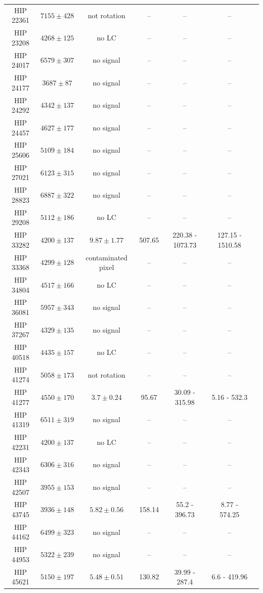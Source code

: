 \begin{longtable}{|c|c|c|c|c|c|c|}
HIP 22361 & $ 7155 \pm 428 $ & not rotation &-- &-- &-- \\
HIP 23208 & $ 4268 \pm 125 $ & no LC &-- &-- &-- \\
HIP 24017 & $ 6579 \pm 307 $ & no signal &-- &-- &-- \\
HIP 24177 & $ 3687 \pm 87 $ & no signal &-- &-- &-- \\
HIP 24292 & $ 4342 \pm 137 $ & no signal &-- &-- &-- \\
HIP 24457 & $ 4627 \pm 177 $ & no signal &-- &-- &-- \\
HIP 25606 & $ 5109 \pm 184 $ & no signal &-- &-- &-- \\
HIP 27021 & $ 6123 \pm 315 $ & no signal &-- &-- &-- \\
HIP 28823 & $ 6887 \pm 322 $ & no signal &-- &-- &-- \\
HIP 29208 & $ 5112 \pm 186 $ & no LC &-- &-- &-- \\
HIP 33282 & $ 4200 \pm 137 $ &$ 9.87 \pm 1.77 $ & 507.65 & 220.38 - 1073.73 & 127.15 - 1510.58 \\
HIP 33368 & $ 4299 \pm 128 $ & contaminated pixel &-- &-- &-- \\
HIP 34804 & $ 4517 \pm 166 $ & no LC &-- &-- &-- \\
HIP 36081 & $ 5957 \pm 343 $ & no signal &-- &-- &-- \\
HIP 37267 & $ 4329 \pm 135 $ & no signal &-- &-- &-- \\
HIP 40518 & $ 4435 \pm 157 $ & no LC &-- &-- &-- \\
HIP 41274 & $ 5058 \pm 173 $ & not rotation &-- &-- &-- \\
HIP 41277 & $ 4550 \pm 170 $ &$ 3.7 \pm 0.24 $ & 95.67 & 30.09 - 315.98 & 5.16 - 532.3 \\
HIP 41319 & $ 6511 \pm 319 $ & no signal &-- &-- &-- \\
HIP 42231 & $ 4200 \pm 137 $ & no LC &-- &-- &-- \\
HIP 42343 & $ 6306 \pm 316 $ & no signal &-- &-- &-- \\
HIP 42507 & $ 3955 \pm 153 $ & no signal  & -- &-- &-- \\
HIP 43745 & $ 3936 \pm 148 $ &$ 5.82 \pm 0.56 $ & 158.14 & 55.2 - 396.73 & 8.77 - 574.25 \\
HIP 44162 & $ 6499 \pm 323 $ & no signal &-- &-- &-- \\
HIP 44953 & $ 5322 \pm 239 $ & no signal &-- &-- &-- \\
HIP 45621 & $ 5150 \pm 197 $ &$ 5.48 \pm 0.51 $ & 130.82 & 39.99 - 287.4 & 6.6 - 419.96 \\

\end{longtable}
